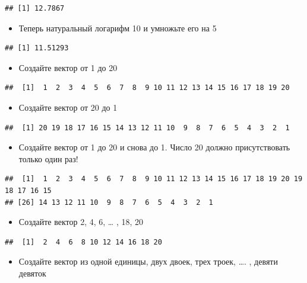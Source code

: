 \documentclass[]{book}
\providecommand{\tightlist}{%
  \setlength{\itemsep}{0pt}\setlength{\parskip}{0pt}}
\begin{document}
\begin{verbatim}
## [1] 12.7867
\end{verbatim}

\begin{itemize}
\tightlist
\item
  Теперь натуральный логарифм 10 и умножьте его на 5
\end{itemize}

\begin{verbatim}
## [1] 11.51293
\end{verbatim}

\begin{itemize}
\tightlist
\item
  Создайте вектор от 1 до 20
\end{itemize}

\begin{verbatim}
##  [1]  1  2  3  4  5  6  7  8  9 10 11 12 13 14 15 16 17 18 19 20
\end{verbatim}

\begin{itemize}
\tightlist
\item
  Создайте вектор от 20 до 1
\end{itemize}

\begin{verbatim}
##  [1] 20 19 18 17 16 15 14 13 12 11 10  9  8  7  6  5  4  3  2  1
\end{verbatim}

\begin{itemize}
\tightlist
\item
  Создайте вектор от 1 до 20 и снова до 1. Число 20 должно
  присутствовать только один раз!
\end{itemize}

\begin{verbatim}
##  [1]  1  2  3  4  5  6  7  8  9 10 11 12 13 14 15 16 17 18 19 20 19 18 17 16 15
## [26] 14 13 12 11 10  9  8  7  6  5  4  3  2  1
\end{verbatim}

\begin{itemize}
\tightlist
\item
  Создайте вектор 2, 4, 6, \ldots{} , 18, 20
\end{itemize}

\begin{verbatim}
##  [1]  2  4  6  8 10 12 14 16 18 20
\end{verbatim}

\begin{itemize}
\tightlist
\item
  Создайте вектор из одной единицы, двух двоек, трех троек, \ldots{}. ,
  девяти девяток
\end{itemize}
\end{document}
